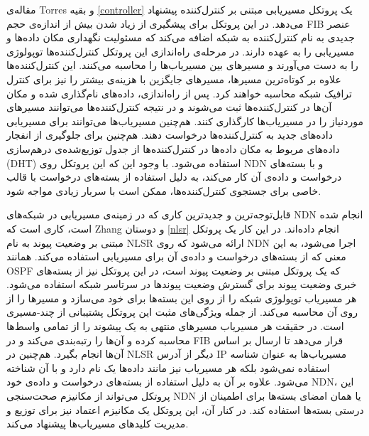 مقاله‌ی Torres و بقیه \ref{controller} یک پروتکل مسیریابی مبتنی بر کنترل‌کننده پیشنهاد می‌دهد. در این پروتکل برای پیشگیری از زیاد شدن بیش از اندازه‌ی حجم FIB عنصر جدیدی به نام کنترل‌کننده به شبکه اضافه می‌کند که مسئولیت نگهداری مکان داده‌ها و مسیریابی را به عهده دارند. در مرحله‌ی راه‌اندازی این پروتکل کنترل‌کننده‌ها توپولوژی را به دست می‌آورند و مسیرهای بین مسیریاب‌ها را محاسبه می‌کنند. این کنترل‌کننده‌ها علاوه بر کوتاه‌ترین مسیرها، مسیر‌های جایگزین با هزینه‌ی بیشتر را نیز برای کنترل ترافیک شبکه محاسبه خواهند کرد. پس از راه‌اندازی، داده‌های نام‌گذاری شده و مکان آن‌ها در کنترل‌کننده‌ها ثبت می‌شوند و در نتیجه کنترل‌کننده‌ها می‌توانند مسیرهای موردنیاز را در مسیریاب‌ها کارگذاری کنند. هم‌چنین مسیریاب‌ها می‌توانند برای مسیریابی داده‌های جدید به کنترل‌کننده‌ها درخواست دهند. هم‌چنین برای جلوگیری از انفجار داده‌های مربوط به مکان داده‌ها در کنترل‌کننده‌ها از جدول توزیع‌شده‌ی درهم‌سازی  (DHT) استفاده می‌شود. با وجود این که این پروتکل روی NDN و با بسته‌های درخواست و داده‌ی آن کار می‌کند، به دلیل استفاده از بسته‌های درخواست با قالب خاصی برای جستجوی کنترل‌کننده‌ها، ممکن است با سربار زیادی مواجه شود. 

قابل‌توجه‌ترین و جدیدترین کاری که در زمینه‌ی مسیریابی در شبکه‌های NDN انجام شده است، کاری است که Zhang و دوستان \ref{nlsr} انجام داده‌اند. در این کار یک پروتکل مبتنی بر وضعیت پیوند به نام NLSR ارائه می‌شود که روی NDN اجرا می‌شود، به این معنی که از بسته‌های درخواست و داده‌ی آن برای مسیریابی استفاده می‌کند. همانند OSPF که یک پروتکل مبتنی بر وضعیت پیوند است، در این پروتکل نیز از بسته‌های خبری وضعیت پیوند برای گسترش وضعیت پیوندها در سرتاسر شبکه استفاده می‌‌شود. هر مسیریاب توپولوژی شبکه را از روی این بسته‌ها برای خود می‌سازد و مسیرها را از روی آن محاسبه می‌کند. از جمله ویژگی‌های مثبت این پروتکل پشتیبانی از چند-مسیری است. در حقیقت هر مسیریاب مسیرهای منتهی به یک پیشوند را از تمامی واسط‌ها محاسبه کرده و آن‌ها را رتبه‌بندی می‌کند و در FIB قرار می‌دهد تا ارسال بر اساس آن‌ها انجام بگیرد. هم‌چنین در NLSR دیگر از آدرس IP مسیریاب‌ها به عنوان شناسه استفاده نمی‌شود بلکه هر مسیریاب نیز مانند داده‌ها یک نام دارد و با آن شناخته می‌شود. علاوه بر آن به دلیل استفاده از بسته‌های درخواست و داده‌ی خود NDN، این پروتکل می‌تواند از مکانیزم صحت‌سنجی NDN یا همان امضای بسته‌ها برای اطمینان از درستی بسته‌ها استفاده کند. در کنار آن، این پروتکل یک مکانیزم اعتماد نیز برای توزیع و مدیریت کلید‌های مسیریاب‌ها پیشنهاد می‌کند.

